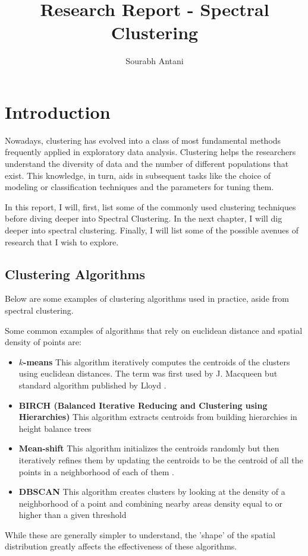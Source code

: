 \documentclass[10pt,a4paper, nocenter]{report}
\author{Sourabh Antani}
\title{Research Report - Spectral Clustering}
\date{}
\begin{document}
	\maketitle

	
	\chapter{Introduction}
    \thispagestyle{fancy}
    Nowadays, clustering has evolved into a class of most fundamental methods
    frequently applied in exploratory data analysis. Clustering helps the researchers understand the diversity of data and the number of different populations that exist. This knowledge, in turn, aids in subsequent tasks like the choice of modeling or classification techniques and the parameters for tuning them. 
	
    In this report, I will, first, list some of the commonly used clustering techniques before diving deeper into Spectral Clustering. In the next chapter, I will dig deeper into spectral clustering. Finally, I will list some of the possible avenues of research that I wish to explore. 

    \section*{Clustering Algorithms}
    Below are some examples of clustering algorithms used in practice, aside from spectral clustering. 
    
    Some common examples of algorithms that rely on euclidean distance and spatial density of points are:

    \begin{itemize}
        \item \textbf{$k$-means} This algorithm iteratively computes the centroids of the clusters using euclidean distances. The term was first used by J. Macqueen \cite{Macqueen67kmeans} but standard algorithm published by Lloyd \cite{Lloyd-82-kmeans}.
        \item \textbf{BIRCH (Balanced Iterative Reducing and Clustering using Hierarchies)} This algorithm extracts centroids from building hierarchies in height balance trees \cite{zhang-96-birch}
        \item \textbf{Mean-shift} This algorithm initializes the centroids randomly but then iteratively refines them by updating the centroids to be the centroid of all the points in a neighborhood of each of them \cite{Cheng95meanshift}.
        \item \textbf{DBSCAN} This algorithm creates clusters by looking at the density of a neighborhood of a point and combining nearby areas density equal to or higher than a given threshold \cite{Ester96adensity-based}
    \end{itemize}
        While these are generally simpler to understand, the 'shape' of the spatial distribution greatly affects the effectiveness of these algorithms. 
\end{document}
